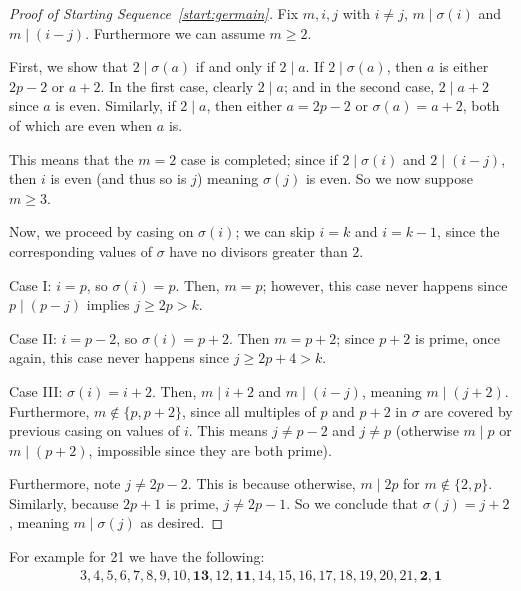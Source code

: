 \documentclass{article}
\theoremstyle{definition}
\theoremstyle{remark}
\numberwithin{equation}{section}
\numberwithin{case}{theorem}
\begin{document}
\begin{proof}[Proof of Starting Sequence~\ref{start:germain}]
    Fix $m, i, j$ with $i \neq j$, $m \mid \sigma(i)$ and $m \mid (i - j)$. Furthermore we can assume $m \geq 2$.

    First, we show that $2 \mid \sigma(a)$ if and only if $2 \mid a$. If $2 \mid \sigma(a)$, then $a$ is either $2p - 2$ or $a + 2$. In the first case, clearly $2 \mid a$; and in the second case, $2 \mid a + 2$ since $a$ is even. Similarly, if $2 \mid a$, then either $a = 2p - 2$ or $\sigma(a) = a + 2$, both of which are even when $a$ is.

    This means that the $m = 2$ case is completed; since if $2 \mid \sigma(i)$ and $2 \mid (i - j)$, then $i$ is even (and thus so is $j$) meaning $\sigma(j)$ is even. So we now suppose $m \geq 3$.

    Now, we proceed by casing on $\sigma(i)$; we can skip $i = k$ and $i = k - 1$, since the corresponding values of $\sigma$ have no divisors greater than $2$.

    Case I: $i = p$, so $\sigma(i) = p$. Then, $m = p$; however, this case never happens since $p \mid (p - j)$ implies $j \geq 2p > k$.

    Case II: $i = p - 2$, so $\sigma(i) = p + 2$. Then $m = p + 2$; since $p + 2$ is prime, once again, this case never happens since $j \geq 2p + 4 > k$.

    Case III: $\sigma(i) = i + 2$. Then, $m \mid i + 2$ and $m \mid (i - j)$, meaning $m \mid (j + 2)$. Furthermore, $m \notin \{p, p+2\}$, since all multiples of $p$ and $p+2$ in $\sigma$ are covered by previous casing on values of $i$. This means $j \neq p-2$ and $j \neq p$ (otherwise $m \mid p$ or $m \mid (p+2)$, impossible since they are both prime).

    Furthermore, note $j \neq 2p - 2$. This is because otherwise, $m \mid 2p$ for $m \notin \{ 2, p \}$. Similarly, because $2p+1$ is prime, $j \neq 2p-1$. So we conclude that $\sigma(j) = j + 2$, meaning $m \mid \sigma(j)$ as desired.
\end{proof}
For example for 21 we have the following: 
\begin{gather*} 3,4,5,6,7,8,9,10,\mathbf{13},12,\mathbf{11},14,15,16,17,18,19,20,21,\mathbf{2},\mathbf{1} 
\end{gather*}
\end{document}
